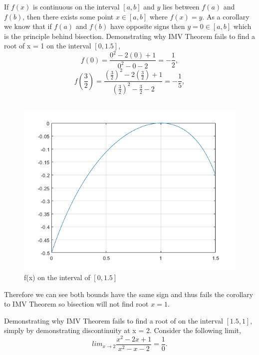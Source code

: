 \documentclass[12pt]{article}
\makeatletter
\theoremstyle{homework}
\newenvironment{exercise}[1]
{\def\@currentlabel{#1}\exercisecore}
{\endexercisecore}
\makeatother
\begin{document}
\begin{exercise}{Chapter 4: 10}
If $f(x)$ is continuous on the interval $[a,b]$ and $y$ lies between $f(a)$ and $f(b)$, then there exists some point $x \in [a,b]$ where $f(x) = y$.
As a corollary we know that if $f(a)$ and $f(b)$ have opposite signs then $y = 0 \in [a,b]$ which is the principle behind bisection. Demonstrating why IMV Theorem 
fails to find a root of x = 1 on the interval $[0,1.5]$,
\begin{equation*}
  f(0) = \dfrac{0^2 - 2(0) + 1}{0^2 - 0 - 2} = -\dfrac{1}{2},
\end{equation*}
\begin{equation*}
  f(\frac{3}{2}) = \frac{(\frac{3}{2})^2 - 2(\frac{3}{2}) + 1}{(\frac{3}{2})^2 - \frac{3}{2} - 2} = -\frac{1}{5},
\end{equation*}\\
\begin{figure}[H]
  \caption{f(x) on the interval of $[0,1.5]$}
  \centering
  \includegraphics[width = .75 \textwidth,]{samesign.png}
  \end{figure}
Therefore we can see both bounds have the same sign and thus fails the corollary to IMV Theorem so bisection will not find root $x = 1$. \\
\vspace{1in}

Demonstrating why IMV Theorem fails to find a root of on the interval $[1.5,1]$, simply by demonstrating discontinuity at x = 2. Consider the following limit,
\begin{equation*}
  lim_{x \to 2} \dfrac{x^2 - 2x + 1}{x^2 - x - 2} = \dfrac{1}{0}.
\end{equation*}


\end{exercise}
\end{document}

